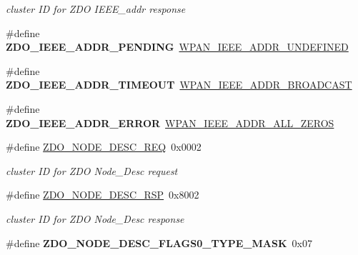 \begin{DoxyCompactItemize}
\begin{DoxyCompactList}\small\item\em cluster I\-D for Z\-D\-O I\-E\-E\-E\-\_\-addr response \end{DoxyCompactList}\item 
\hypertarget{group__zdo_gabf3af6fc6700372bca9d0bc7117b28bc}{\#define {\bfseries Z\-D\-O\-\_\-\-I\-E\-E\-E\-\_\-\-A\-D\-D\-R\-\_\-\-P\-E\-N\-D\-I\-N\-G}~\hyperlink{group__wpan__types_ga09e965ef6cfbfd48312d86bb011f125b}{W\-P\-A\-N\-\_\-\-I\-E\-E\-E\-\_\-\-A\-D\-D\-R\-\_\-\-U\-N\-D\-E\-F\-I\-N\-E\-D}}\label{group__zdo_gabf3af6fc6700372bca9d0bc7117b28bc}

\item 
\hypertarget{group__zdo_ga69da31cc1a3b48c9053c14fc0dbd2522}{\#define {\bfseries Z\-D\-O\-\_\-\-I\-E\-E\-E\-\_\-\-A\-D\-D\-R\-\_\-\-T\-I\-M\-E\-O\-U\-T}~\hyperlink{group__wpan__types_gaced36f5538c5bb2da4f60a90313f1674}{W\-P\-A\-N\-\_\-\-I\-E\-E\-E\-\_\-\-A\-D\-D\-R\-\_\-\-B\-R\-O\-A\-D\-C\-A\-S\-T}}\label{group__zdo_ga69da31cc1a3b48c9053c14fc0dbd2522}

\item 
\hypertarget{group__zdo_ga5e2b6207146eebf6c4787ca3d9448491}{\#define {\bfseries Z\-D\-O\-\_\-\-I\-E\-E\-E\-\_\-\-A\-D\-D\-R\-\_\-\-E\-R\-R\-O\-R}~\hyperlink{group__wpan__types_ga014f9d0857312b6a7f80ee10ecfd0935}{W\-P\-A\-N\-\_\-\-I\-E\-E\-E\-\_\-\-A\-D\-D\-R\-\_\-\-A\-L\-L\-\_\-\-Z\-E\-R\-O\-S}}\label{group__zdo_ga5e2b6207146eebf6c4787ca3d9448491}

\item 
\hypertarget{group__zdo_ga93263f3bfe644fea4faf6d3a526bcfb8}{\#define \hyperlink{group__zdo_ga93263f3bfe644fea4faf6d3a526bcfb8}{Z\-D\-O\-\_\-\-N\-O\-D\-E\-\_\-\-D\-E\-S\-C\-\_\-\-R\-E\-Q}~0x0002}\label{group__zdo_ga93263f3bfe644fea4faf6d3a526bcfb8}

\begin{DoxyCompactList}\small\item\em cluster I\-D for Z\-D\-O Node\-\_\-\-Desc request \end{DoxyCompactList}\item 
\hypertarget{group__zdo_ga14f5651d9702f40c194e964756256c94}{\#define \hyperlink{group__zdo_ga14f5651d9702f40c194e964756256c94}{Z\-D\-O\-\_\-\-N\-O\-D\-E\-\_\-\-D\-E\-S\-C\-\_\-\-R\-S\-P}~0x8002}\label{group__zdo_ga14f5651d9702f40c194e964756256c94}

\begin{DoxyCompactList}\small\item\em cluster I\-D for Z\-D\-O Node\-\_\-\-Desc response \end{DoxyCompactList}\item 
\hypertarget{group__zdo_gaf67b237d220ee838548a60bf74a2c57b}{\#define {\bfseries Z\-D\-O\-\_\-\-N\-O\-D\-E\-\_\-\-D\-E\-S\-C\-\_\-\-F\-L\-A\-G\-S0\-\_\-\-T\-Y\-P\-E\-\_\-\-M\-A\-S\-K}~0x07}\label{group__zdo_gaf67b237d220ee838548a60bf74a2c57b}


\end{DoxyCompactItemize}
